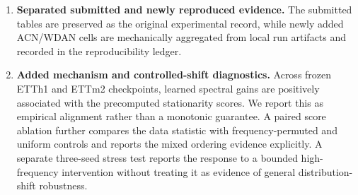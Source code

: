 \begin{enumerate}[leftmargin=1.6em,itemsep=0.65em]
  \item \textbf{Separated submitted and newly reproduced evidence.}
  The submitted tables are preserved as the original experimental record,
  while newly added ACN/WDAN cells are mechanically aggregated from local
  run artifacts and recorded in the reproducibility ledger.

  \item \textbf{Added mechanism and controlled-shift diagnostics.}
  Across frozen ETTh1 and ETTm2 checkpoints, learned spectral gains are
  positively associated with the precomputed stationarity scores. We report
  this as empirical alignment rather than a monotonic guarantee. A paired
  score ablation further compares the data statistic with frequency-permuted
  and uniform controls and reports the mixed ordering evidence explicitly. A
  separate three-seed stress test reports the response to a bounded
  high-frequency intervention without treating it as evidence of general
  distribution-shift robustness.
\end{enumerate}
